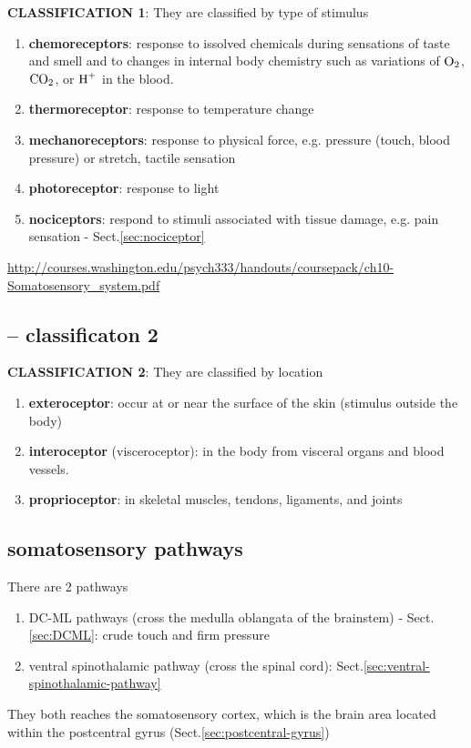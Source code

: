 {\bf CLASSIFICATION 1}: They are classified by type of stimulus 
\begin{enumerate}

  \item {\bf chemoreceptors}: response to issolved chemicals during sensations
  of taste and smell and to changes in internal body chemistry such as variations
  of $\ce{O2}$, $\ce{CO2}$, or $\ce{H^+}$ in the blood.
   
  \item {\bf thermoreceptor}: response to temperature change
  
  \item {\bf mechanoreceptors}: response to physical force, e.g. pressure
  (touch, blood pressure) or stretch, tactile sensation
  
  \item {\bf photoreceptor}: response to light 
  
  \item {\bf nociceptors}: respond to stimuli associated with tissue damage,
  e.g.  pain sensation - Sect.\ref{sec:nociceptor}
\end{enumerate}
\url{http://courses.washington.edu/psych333/handouts/coursepack/ch10-Somatosensory_system.pdf}

\subsection{-- classificaton 2}

{\bf CLASSIFICATION 2}: They are classified by location
\begin{enumerate}
  \item {\bf exteroceptor}: occur at or near the surface of the skin (stimulus
  outside the body)
  
  \item {\bf interoceptor} (visceroceptor): in the body from visceral organs and
  blood vessels.
  
  \item {\bf proprioceptor}: in skeletal muscles, tendons, ligaments, and joints
\end{enumerate}


\subsection{somatosensory pathways}
\label{sec:somatosensory-pathways}

There are 2 pathways
\begin{enumerate}
  \item DC-ML pathways (cross the medulla oblangata of the brainstem) -
  Sect.\ref{sec:DCML}: crude touch and firm pressure
  
  \item ventral spinothalamic pathway (cross the spinal cord):
  Sect.\ref{sec:ventral-spinothalamic-pathway} 
  
\end{enumerate}
They both reaches the somatosensory cortex, which is the brain area located
within the postcentral gyrus (Sect.\ref{sec:postcentral-gyrus})


